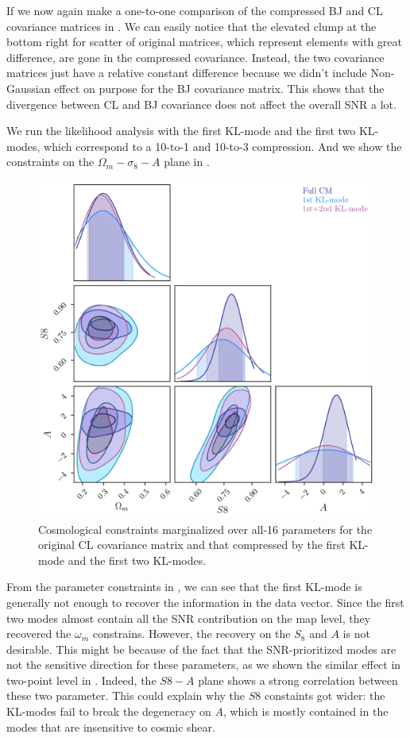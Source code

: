 \documentclass[twocolumn]{\docclass}
\begin{document}
	If we now again make a one-to-one comparison of the compressed BJ and CL covariance matrices in . We can easily notice that the elevated clump at the bottom right for scatter of original matrices, which represent elements with great difference, are gone in the compressed covariance. Instead, the two covariance matrices just have a relative constant difference because we didn't include Non-Gaussian effect on purpose for the BJ covariance matrix. This shows that the divergence between CL and BJ covariance does not affect the overall SNR a lot. 
	
	We run the likelihood analysis with the first KL-mode and the first two KL-modes, which correspond to a 10-to-1 and 10-to-3 compression. And we show the constraints on the $\Omega_m - \sigma_8 - A$ plane in .
	
	\begin{figure}
		\includegraphics[width=0.8\columnwidth]{om_s8_A_full_1st_2nd.png}
		\caption{ Cosmological constraints marginalized over all-16 parameters for the original CL covariance matrix and that compressed by the first KL-mode and the first two KL-modes.\label{fig:kl-constaints}}
	\end{figure}
	
	From the parameter constraints in , we can see that the first KL-mode is generally not enough to recover the information in the data vector. Since the first two modes almost contain all the SNR contribution on the map level, they recovered the $\omega_m$ constrains. However, the recovery on the $S_8$ and $A$ is not desirable. This might be because of the fact that the SNR-prioritized modes are not the sensitive direction for these parameters, as we shown the similar effect in two-point level in . Indeed, the $S8 - A$ plane shows a strong correlation between these two parameter. This could explain why the $S8$ constaints got wider: the KL-modes fail to break the degeneracy on $A$, which is mostly contained in the modes that are insensitive to cosmic shear.
	
\end{document}
